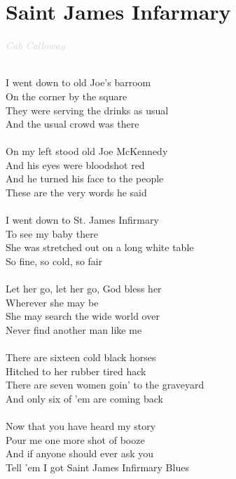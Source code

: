 \documentclass[a5paper, 10pt]{book}
\begin{document}
\section{Saint James Infarmary}\textcolor{lightgray}{\textit{Cab Calloway}}\\~\\
\begin{minipage}[t]{0.8\textwidth}
I went down to old Joe's barroom\\
On the corner by the square\\
They were serving the drinks as usual\\
And the usual crowd was there\\
\\
On my left stood old Joe McKennedy\\
And his eyes were bloodshot red\\
And he turned his face to the people\\
These are the very words he said\\
\\
I went down to St. James Infirmary\\
To see my baby there\\
She was stretched out on a long white table\\
So fine, so cold, so fair\\
\\
Let her go, let her go, God bless her\\
Wherever she may be\\
She may search the wide world over\\
Never find another man like me\\
\\
There are sixteen cold black horses\\
Hitched to her rubber tired hack\\
There are seven women goin' to the graveyard\\
And only six of 'em are coming back\\
\\
Now that you have heard my story\\
Pour me one more shot of booze\\
And if anyone should ever ask you\\
Tell 'em I got Saint James Infirmary Blues\\
\end{minipage}
\end{document}
